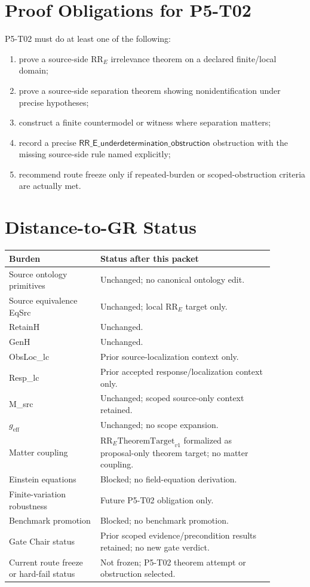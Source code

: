 \documentclass[11pt]{article}
\newcommand{\RRE}{\mathrm{RR}_E}
\newcommand{\RRTarget}{\mathrm{RR}_{E}\mathrm{TheoremTarget}_{v1}}
\newcommand{\RRUnder}{\mathsf{RR\_E\_underdetermination\_obstruction}}
\begin{document}
\section{Proof Obligations for P5-T02}

P5-T02 must do at least one of the following:
\begin{enumerate}[label=O\arabic*.,leftmargin=*]
  \item prove a source-side \(\RRE\) irrelevance theorem on a declared
  finite/local domain;
  \item prove a source-side separation theorem showing nonidentification under
  precise hypotheses;
  \item construct a finite countermodel or witness where separation matters;
  \item record a precise \(\RRUnder\) obstruction with the missing source-side
  rule named explicitly;
  \item recommend route freeze only if repeated-burden or scoped-obstruction
  criteria are actually met.
\end{enumerate}

\section{Distance-to-GR Status}

\begin{longtable}{p{0.30\linewidth}p{0.58\linewidth}}
\toprule
Burden & Status after this packet \\
\midrule
Source ontology primitives & Unchanged; no canonical ontology edit. \\
Source equivalence EqSrc & Unchanged; local \(\RRE\) target only. \\
RetainH & Unchanged. \\
GenH & Unchanged. \\
ObsLoc\_lc & Prior source-localization context only. \\
Resp\_lc & Prior accepted response/localization context only. \\
M\_src & Unchanged; scoped source-only context retained. \\
\(g_{\mathrm{eff}}\) & Unchanged; no scope expansion. \\
Matter coupling & \(\RRTarget\) formalized as proposal-only theorem target;
no matter coupling. \\
Einstein equations & Blocked; no field-equation derivation. \\
Finite-variation robustness & Future P5-T02 obligation only. \\
Benchmark promotion & Blocked; no benchmark promotion. \\
Gate Chair status & Prior scoped evidence/precondition results retained; no
new gate verdict. \\
Current route freeze or hard-fail status & Not frozen; P5-T02 theorem attempt
or obstruction selected. \\
\bottomrule
\end{longtable}
\end{document}
